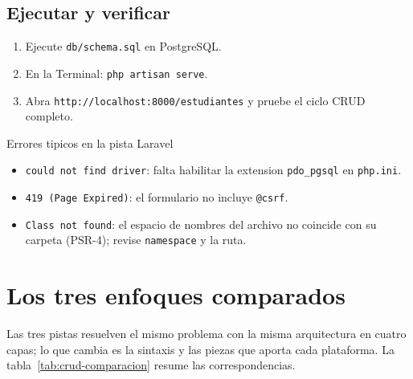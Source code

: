 \documentclass[11pt,a4paper,openany]{book}
\begin{document}
\subsection{Ejecutar y verificar}
\label{ap:crud:laravel:run}

\begin{enumerate}
\item Ejecute \texttt{db/schema.sql} en PostgreSQL.
\item En la Terminal: \texttt{php artisan serve}.
\item Abra \texttt{http://localhost:8000/estudiantes} y pruebe el ciclo
CRUD completo.
\end{enumerate}

\begin{cajaadvertencia}{Errores tipicos en la pista Laravel}
\begin{itemize}
\item \texttt{could not find driver}: falta habilitar la extension
\texttt{pdo\_pgsql} en \texttt{php.ini}.
\item \texttt{419 (Page Expired)}: el formulario no incluye
\texttt{@csrf}.
\item \texttt{Class not found}: el espacio de nombres del archivo no
coincide con su carpeta (PSR-4); revise \texttt{namespace} y la ruta.
\end{itemize}
\end{cajaadvertencia}

\section{Los tres enfoques comparados}
\label{ap:crud:comparacion}

Las tres pistas resuelven el mismo problema con la misma arquitectura
en cuatro capas; lo que cambia es la sintaxis y las piezas que aporta
cada plataforma. La tabla~\ref{tab:crud-comparacion} resume las
correspondencias.
\end{document}
